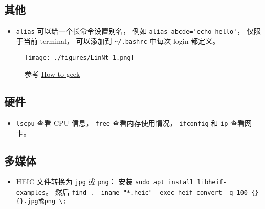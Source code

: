 \subsection{其他}
\begin{itemize}
\item \verb`alias` 可以给一个长命令设置别名， 例如 \verb|alias abcde='echo hello'|， 仅限于当前 terminal， 可以添加到 \verb|~/.bashrc| 中每次 login 都定义。
\end{itemize}

\begin{figure}[ht]
\centering
\texttt{[image: ./figures/LinNt\_1.png]}
\caption{参考 \href{https://www.howtogeek.com/}{How to geek}} \label{LinNt_fig1}
\end{figure}

\subsection{硬件}
\begin{itemize}
\item \verb|lscpu| 查看 CPU 信息， \verb|free| 查看内存使用情况， \verb|ifconfig| 和 \verb|ip| 查看网卡。
\end{itemize}

\subsection{多媒体}
\begin{itemize}
\item HEIC 文件转换为 \verb|jpg| 或 \verb|png|： 安装 \verb|sudo apt install libheif-examples|。 然后 \verb|find . -iname "*.heic" -exec heif-convert -q 100 {} {}.jpg或png \;|
\end{itemize}
